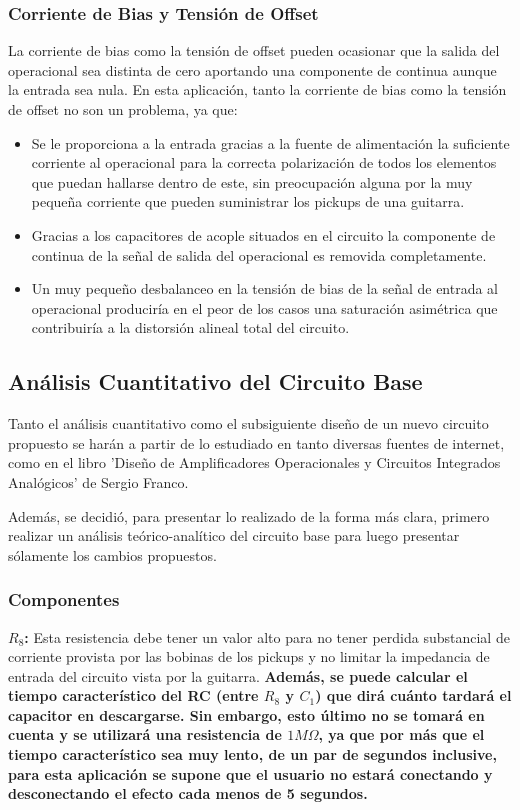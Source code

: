 \subsubsection{Corriente de Bias y Tensión de Offset}
La corriente de bias como la tensión de offset pueden ocasionar que la salida del operacional sea distinta de cero aportando una componente de continua aunque la entrada sea nula. En esta aplicación, tanto la corriente de bias como la tensión de offset no son un problema, ya que:
\begin{itemize}
\item Se le proporciona a la entrada gracias a la fuente de alimentación la suficiente corriente al operacional para la correcta polarización de todos los elementos que puedan hallarse dentro de este, sin preocupación alguna por la muy pequeña corriente que pueden suministrar los pickups de una guitarra.
\item Gracias a los capacitores de acople situados en el circuito la componente de continua de la señal de salida del operacional es removida completamente.
\item Un muy pequeño desbalanceo en la tensión de bias de la señal de entrada al operacional produciría en el peor de los casos una saturación asimétrica que contribuiría a la distorsión alineal total del circuito.
\end{itemize} 

\subsection{Análisis Cuantitativo del Circuito Base}

Tanto el análisis cuantitativo como el subsiguiente diseño de un nuevo circuito propuesto se harán a partir de lo estudiado en tanto diversas fuentes de internet, como en el libro 'Diseño de Amplificadores Operacionales y Circuitos Integrados Analógicos' de Sergio Franco.

Además, se decidió, para presentar lo realizado de la forma más clara, primero realizar un análisis teórico-analítico del circuito base para luego presentar sólamente los cambios propuestos.

\subsubsection{Componentes}

\textbf{$R_8$:}
Esta resistencia debe tener un valor alto para no tener perdida substancial de corriente provista por las bobinas de los pickups y no limitar la impedancia de entrada del circuito vista por la guitarra. \textbf{Además, se puede calcular el tiempo característico del RC (entre $R_8$ y $C_1$) que dirá cuánto tardará el capacitor en descargarse. Sin embargo, esto último no se tomará en cuenta y se utilizará una resistencia de $1M\Omega$, ya que por más que el tiempo característico sea muy lento, de un par de segundos inclusive, para esta aplicación se supone que el usuario no estará conectando y desconectando el efecto cada menos de 5 segundos.} \\

